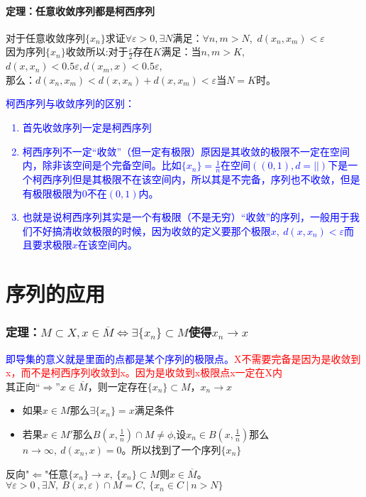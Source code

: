 \documentclass[11pt]{article}
\begin{document}
\begin{CJK*}{UTF8}{gbsn}
\subsection{定理：任意收敛序列都是柯西序列}
对于任意收敛序列$\{x_n\}$求证$\forall \varepsilon>0,\exists N$满足：$\forall n,m>N$,~$d(x_n,x_m)<\varepsilon$\\
因为序列$\{x_n\} $收敛所以:对于$\frac{\varepsilon}{2}$存在$K$满足：当$n,m>K$,$d(x,x_n)<0.5\varepsilon,d(x_m,x)<0.5\varepsilon$,\\那么：$d(x_n,x_m)<d(x,x_n)+d(x,x_m)<\varepsilon$当$N=K$时。\\
\textcolor{blue}{柯西序列与收敛序列的区别：\\
\begin{enumerate}
	\item 首先收敛序列一定是柯西序列
	\item 柯西序列不一定“收敛”（但一定有极限）原因是其收敛的极限不一定在空间内，除非该空间是个完备空间。比如$\{x_n\}=\frac{1}{n}$在空间$((0,1),d=||)$下是一个柯西序列但是其极限不在该空间内，所以其是不完备，序列也不收敛，但是有极限极限为0不在$(0,1)$内。
	\item 也就是说柯西序列其实是一个有极限（不是无穷）“收敛”的序列，一般用于我们不好搞清收敛极限的时候，因为收敛的定义要那个极限$x,~$$d(x,x_n)<\varepsilon$而且要求极限$x$在该空间内。
\end{enumerate}}
\pagebreak
\part{序列的应用}
\setcounter{section}{0}
\section{定理：$M\subset X, x\in \overline M\Leftrightarrow \exists \{x_n\}\subset M$使得$x_n\rightarrow x$}
\textcolor{blue}{即导集的意义就是里面的点都是某个序列的极限点。}\textcolor{red}{X不需要完备是因为是收敛到x，而不是柯西序列收敛到x。因为是收敛到x极限点x一定在X内}\\
其正向“$\Rightarrow $”$x\in \overline M$，则一定存在$\{x_n\}\subset M$，$x_n\rightarrow x$
\begin{itemize}
	\item 如果$x\in M$那么$\exists \{x_n\}=x $满足条件
	\item 若果$x\in M'$那么$ B(x,\frac{1}{n} )\cap M\neq \phi$,设$x_n\in B(x,\frac{1}{n})$那么$n\rightarrow \infty,~d(x_n,x)=0$。所以找到了一个序列$\{x_n\} $
	\end{itemize}
反向"$\Leftarrow$"任意$\{x_n\}\rightarrow x,~\{x_n\}\subset M$则$x\in \overline M$。
	$\forall \varepsilon>0~,\exists N,~B(x,\varepsilon )\cap M=C,~\{x_n\in C~|~n>N\}$

\end{CJK*}
\end{document}
